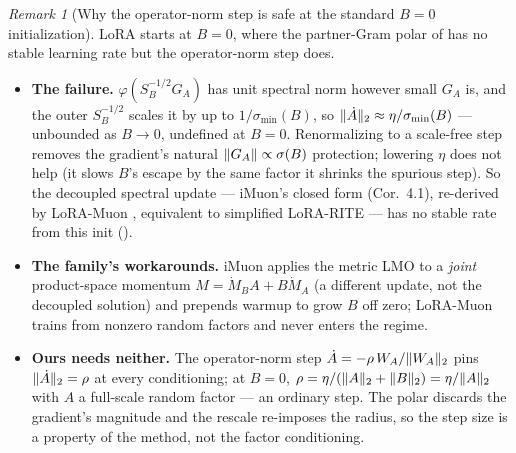 \documentclass[11pt]{article}
\DeclarePairedDelimiter{\norm}{\lVert}{\rVert}
\newcommand{\polar}{\varphi}                 %
\theoremstyle{plain}
\theoremstyle{definition}
\theoremstyle{remark}
\newtheorem{remark}{Remark}
\begin{document}
\begin{remark}[Why the operator-norm step is safe at the standard $B{=}0$ initialization]
\label{rem:b0}
LoRA starts at $B{=}0$, where the partner-Gram polar of  has no stable learning rate but the operator-norm step does.
\begin{itemize}[leftmargin=1.5em,itemsep=1pt,topsep=2pt]
  \item \textbf{The failure.} $\polar(S_B^{-1/2}G_A)$ has unit spectral norm however small $G_A$ is, and the outer $S_B^{-1/2}$ scales it by up to $1/\sigma_{\min}(B)$, so $\norm{\dot A}_2\approx\eta/\sigma_{\min}(B)$ --- unbounded as $B\to0$, undefined at $B{=}0$. Renormalizing to a scale-free step removes the gradient's natural $\norm{G_A}\propto\sigma(B)$ protection; lowering $\eta$ does not help (it slows $B$'s escape by the same factor it shrinks the spurious step). So the decoupled spectral update --- iMuon's closed form (Cor.\ 4.1), re-derived by LoRA-Muon \cite{loramuon}, equivalent to simplified LoRA-RITE \cite{lorarite} --- has no stable rate from this init ().
  \item \textbf{The family's workarounds.} iMuon applies the metric LMO to a \emph{joint} product-space momentum $M=\dot M_BA+B\dot M_A$ (a different update, not the decoupled solution) and prepends warmup to grow $B$ off zero; LoRA-Muon trains from nonzero random factors and never enters the regime.
  \item \textbf{Ours needs neither.} The operator-norm step $\dot A=-\rho\,W_A/\norm{W_A}_2$ pins $\norm{\dot A}_2=\rho$ at every conditioning; at $B{=}0$, $\rho=\eta/(\norm{A}_2+\norm{B}_2)=\eta/\norm{A}_2$ with $A$ a full-scale random factor --- an ordinary step. The polar discards the gradient's magnitude and the rescale re-imposes the radius, so the step size is a property of the method, not the factor conditioning.
\end{itemize}
\end{remark}
\end{document}
